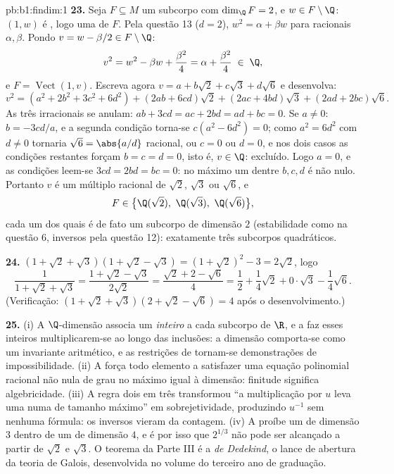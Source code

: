 \begin{solution}{pb:b1:findim:1}
\textbf{23.} Seja $F \subseteq M$ um subcorpo com $\dim_\Q F =
2$, e $w \in F \setminus \Q$: $(1, w)$
é , logo uma  de $F$. Pela questão 13 ($d = 2$), $w^2 = \alpha + \beta w$
para racionais $\alpha, \beta$. Pondo $v = w - \beta/2 \in F
\setminus \Q$:
\[
v^2 = w^2 - \beta w + \frac{\beta^2}4 = \alpha + \frac{\beta^2}4
\;\in\; \Q,
\]
e $F = \operatorname{Vect}(1, v)$. Escreva agora $v = a + b\sqrt2 +
c\sqrt3 + d\sqrt6$ e desenvolva:
\[
v^2 = (a^2 + 2b^2 + 3c^2 + 6d^2)
+ (2ab + 6cd)\sqrt2 + (2ac + 4bd)\sqrt3 + (2ad + 2bc)\sqrt6 .
\]
As três  irracionais se anulam: $ab + 3cd = ac + 2bd =
ad + bc = 0$. Se $a \neq 0$:
$b = -3cd/a$, e a segunda condição torna-se $c(a^2 - 6d^2) = 0$; como $a^2 = 6d^2$ com $d
\neq 0$
tornaria $\sqrt6 = \abs{a/d}$ racional, ou $c = 0$ ou $d = 0$, e nos dois casos
as condições restantes forçam $b =
c = d = 0$, isto é, $v \in \Q$: excluído.
Logo $a = 0$, e as condições leem-se $3cd = 2bd = bc = 0$: no máximo um dentre
$b, c, d$ é não nulo. Portanto $v$ é um múltiplo racional de
$\sqrt2$, $\sqrt3$ ou $\sqrt6$, e
\[
F \in \bigl\{\Q(\sqrt2),\ \Q(\sqrt3),\ \Q(\sqrt6)\bigr\} ,
\]
cada um dos quais é de fato um subcorpo de dimensão $2$
(estabilidade como na questão 6, inversos pela questão 12):
exatamente três subcorpos quadráticos.

\textbf{24.} $(1 + \sqrt2 + \sqrt3)(1 + \sqrt2 - \sqrt3) = (1 +
\sqrt2)^2 - 3 = 2\sqrt2$, logo
\[
\frac1{1 + \sqrt2 + \sqrt3}
= \frac{1 + \sqrt2 - \sqrt3}{2\sqrt2}
= \frac{\sqrt2 + 2 - \sqrt6}{4}
= \frac12 + \frac14\sqrt2 + 0\cdot\sqrt3 - \frac14\sqrt6 .
\]
(Verificação: $(1 + \sqrt2 + \sqrt3)(2 + \sqrt2 - \sqrt6) = 4$ após o desenvolvimento.)

\textbf{25.} (i) A $\Q$-dimensão associa um \emph{inteiro} a cada
subcorpo de $\R$, e a  faz esses inteiros
multiplicarem-se ao longo das inclusões: a dimensão comporta-se
como um invariante aritmético, e as restrições de 
tornam-se demonstrações de impossibilidade. (ii) A  força todo elemento a satisfazer uma equação polinomial
racional não nula de grau no máximo igual à dimensão: finitude
significa algebricidade. (iii) A regra dois em três transformou
``a multiplicação por $u$ leva uma  numa  de
tamanho máximo'' em sobrejetividade, produzindo $u^{-1}$ sem
nenhuma fórmula: os inversos vieram da contagem. (iv) A  proíbe um  de dimensão $3$ dentro de um de dimensão
$4$, e é por isso que $2^{1/3}$ não pode ser alcançado a partir de
$\sqrt2$ e $\sqrt3$. O teorema da Parte III é a \emph{ de Dedekind}, o lance de abertura da teoria de Galois,
desenvolvida no volume do terceiro ano de graduação.
\end{solution}
